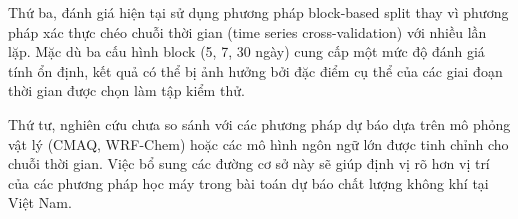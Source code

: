 Thứ ba, đánh giá hiện tại sử dụng phương pháp block-based split thay vì phương pháp xác thực chéo chuỗi thời gian (time series cross-validation) với nhiều lần lặp. Mặc dù ba cấu hình block (5, 7, 30 ngày) cung cấp một mức độ đánh giá tính ổn định, kết quả có thể bị ảnh hưởng bởi đặc điểm cụ thể của các giai đoạn thời gian được chọn làm tập kiểm thử.

Thứ tư, nghiên cứu chưa so sánh với các phương pháp dự báo dựa trên mô phỏng vật lý (CMAQ, WRF-Chem) hoặc các mô hình ngôn ngữ lớn được tinh chỉnh cho chuỗi thời gian. Việc bổ sung các đường cơ sở này sẽ giúp định vị rõ hơn vị trí của các phương pháp học máy trong bài toán dự báo chất lượng không khí tại Việt Nam.
